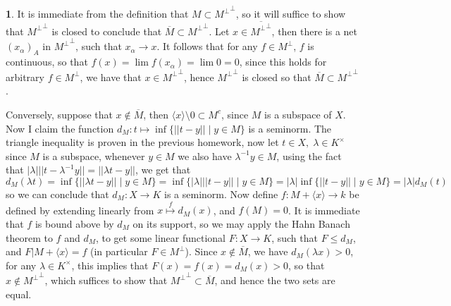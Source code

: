 \documentclass[10.5pt]{article}
\theoremstyle{definition}
\newtheorem{pb}{}
\newcommand{\set}[1]{\{#1\}}
\newcommand{\abs}[1]{\left\vert#1\right\vert}
\newcommand{\norm}[1]{\lvert\lvert#1\rvert\rvert}
\newcommand{\gen}[1]{\langle #1 \rangle}
\begin{document}
        \begin{pb}
            It is immediate from the definition that \(M \subset {M^\perp}^\perp\), so it will suffice to show that \({M^\perp}^\perp\) is closed to conclude that \(\overline{M} \subset {M^\perp}^\perp\). Let \(x \in \overline{{M^\perp}^\perp}\), then there is a net \((x_\alpha)_A\) in \({M^\perp}^\perp\), such that \(x_\alpha \to x\). It follows that for any \(f \in M^\perp\), \(f\) is continuous, so that \(f(x) = \lim f(x_\alpha) = \lim 0 = 0\), since this holds for arbitrary \(f \in M^\perp\), we have that \(x \in {M^\perp}^\perp\), hence \({M^\perp}^\perp\) is closed so that \(\overline{M} \subset {M^\perp}^\perp\).

            Conversely, suppose that \(x \not \in \overline{M}\), then \(\gen{x} \setminus 0 \subset M^c\), since \(M\) is a subspace of \(X\). Now I claim the function \(d_M: t \mapsto \inf\set{\norm{t-y} \mid y \in M}\) is a seminorm. The triangle inequality is proven in the previous homework, now let \(t \in X, \; \lambda \in K^\times \) since \(M\) is a subspace, whenever \(y \in M\) we also have \(\lambda^{-1}y \in M\), using the fact that \(\abs{\lambda}\norm{t - \lambda^{-1}y} = \norm{\lambda t - y}\), we get that \[d_M(\lambda t) = \inf\set{\norm{\lambda t - y} \mid y \in M} = \inf\set{\abs{\lambda}\norm{t - y} \mid y \in M} = \abs{\lambda}\inf\set{\norm{t - y} \mid y \in M} = \abs{\lambda}d_M(t)\]
            so we can conclude that \(d_M: X \to K\) is a seminorm. Now define \(f: M + \gen{x} \to k\) be defined by extending linearly from \(x \overset{f}{\mapsto} d_M(x)\), and \(f(M) = 0\). It is immediate that \(f\) is bound above by \(d_M\) on its support, so we may apply the Hahn Banach theorem to \(f\) and \(d_M\), to get some linear functional \(F: X \to K\), such that \(F \leq d_M\), and \(F\vert M + \gen{x} = f\) (in particular \(F \in M^\perp\)). Since \(x \not \in \overline{M}\), we have \(d_M(\lambda x) > 0\), for any \(\lambda \in K^\times\), this implies that \(F(x) = f(x) = d_M(x) > 0\), so that \(x \not \in {M^{\perp}}^\perp\), which suffices to show that \({M^\perp}^\perp \subset \overline{M}\), and hence the two sets are equal.
        \end{pb}
\end{document}

